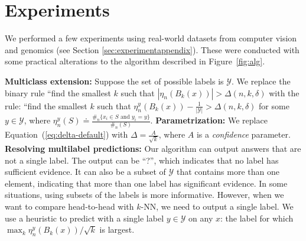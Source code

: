 \documentclass{article}
\newcommand{\algname}{\textsc{AKNN}}
\begin{document}
\section{Experiments}

\newcommand{\labels}{\mathcal{Y}}

We performed a few experiments using real-world datasets from computer vision and genomics (see Section \ref{sec:experimentappendix}). 
These were conducted with some practical alterations to the algorithm described in Figure~\ref{fig:alg}. 

{\bf Multiclass extension:} Suppose the set of possible labels is  $\labels$. We
replace the binary rule ``find the smallest $k$ such that $\left|\eta_n(B_k(x))\right| >
\Delta(n, k,\delta)$ with the rule: ``find the smallest $k$ such that $\eta^y_n(B_k(x)) - \frac{1}{|\labels|}>
\Delta(n, k,\delta)$ for some $y \in \labels$,  where $\eta^y_n(S) \doteq \frac{\#_n\{x_i \in S
    \mbox{ and } y_i = y\}}{\#_n(S)}$.
    \newline
{\bf Parametrization:} 
We replace Equation~(\ref{eq:delta-default}) with $\Delta = \frac{A}{\sqrt{k}}$, where $A$ is a {\em confidence} parameter. \newline
{\bf Resolving multilabel predictions:} 
Our algorithm can output answers that are not a single label. 
The output can be ``?'', which indicates that no label has sufficient evidence. 
It can also be a subset of $\labels$ that contains more than one element, indicating that more than one label has significant evidence. 
In some situations, using subsets of the labels is more informative. 
However, when we want to compare head-to-head with $k$-NN, we need to output a single label. 
We use a heuristic to predict with a single label $y \in \labels$ on any $x$: the label for which $\max_k \eta^y_n(B_k(x))/\sqrt{k}$ is largest.

\pagebreak





\end{document}
